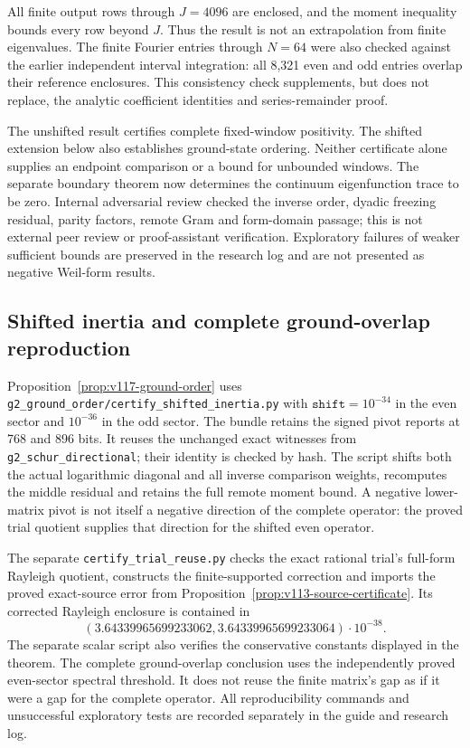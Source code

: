 \documentclass[11pt]{article}
\theoremstyle{remark}
\begin{document}
All finite output rows through $J=4096$ are enclosed, and the moment
inequality bounds every row beyond $J$. Thus the result is not an
extrapolation from finite eigenvalues. The finite Fourier entries through
$N=64$ were also checked against the earlier independent interval
integration: all 8,321 even and odd entries overlap their reference
enclosures. This consistency check supplements, but does not replace,
the analytic coefficient identities and series-remainder proof.

The unshifted result certifies complete fixed-window positivity.
The shifted extension below also establishes ground-state ordering.
Neither certificate alone supplies an endpoint comparison or a bound
for unbounded windows. The separate boundary theorem now determines
the continuum eigenfunction trace to be zero. Internal adversarial review checked the inverse order, dyadic
freezing residual, parity factors, remote Gram and form-domain passage;
this is not external peer review or proof-assistant verification.
Exploratory failures of weaker sufficient bounds are preserved in the
research log and are not presented as negative Weil-form results.

\subsection{Shifted inertia and complete ground-overlap reproduction}
Proposition~\ref{prop:v117-ground-order} uses
\texttt{g2\_ground\_order/certify\_shifted\_inertia.py} with
$\texttt{shift}=10^{-34}$ in the even sector and $10^{-36}$ in the
odd sector. The bundle retains the signed pivot reports at 768 and
896 bits. It reuses the unchanged exact witnesses from
\texttt{g2\_schur\_directional}; their identity is checked by hash.
The script shifts both the actual logarithmic diagonal and all inverse
comparison weights, recomputes the middle residual and retains the
full remote moment bound. A negative lower-matrix pivot is not itself
a negative direction of the complete operator: the proved trial quotient
supplies that direction for the shifted even operator.

The separate \texttt{certify\_trial\_reuse.py} checks the exact rational
trial's full-form Rayleigh quotient, constructs the finite-supported
correction and imports the proved exact-source error from
Proposition~\ref{prop:v113-source-certificate}. Its corrected Rayleigh
enclosure is contained in
\[
 (3.64339965699233062,3.64339965699233064)\cdot10^{-38}.
\]
The separate scalar script also verifies the conservative constants
displayed in the theorem.
The complete ground-overlap conclusion uses the independently proved
even-sector spectral threshold. It does not reuse the finite matrix's
gap as if it were a gap for the complete operator.
All reproducibility commands and unsuccessful exploratory tests are
recorded separately in the guide and research log.
\end{document}
